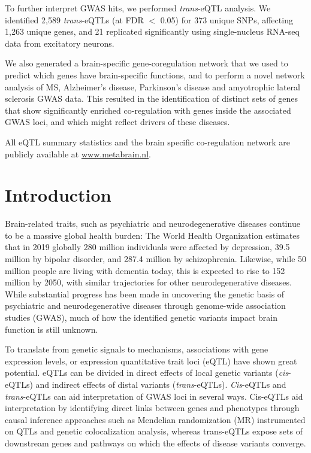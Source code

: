 To further interpret GWAS hits, we performed \emph{trans}-eQTL analysis. We identified 2,589 \emph{trans}-eQTLs (at FDR $<$ 0.05) for 373 unique SNPs, affecting 1,263 unique genes, and 21 replicated significantly using single-nucleus RNA-seq data from excitatory neurons.  

We also generated a brain-specific gene-coregulation network that we used to predict which genes have brain-specific functions, and to perform a novel network analysis of MS, Alzheimer’s disease, Parkinson’s disease and amyotrophic lateral sclerosis GWAS data. This resulted in the identification of distinct sets of genes that show significantly enriched co-regulation with genes inside the associated GWAS loci, and which might reflect drivers of these diseases. 

All eQTL summary statistics and the brain specific co-regulation network are publicly available at \url{www.metabrain.nl}. 

\section{Introduction}
Brain-related traits, such as psychiatric and neurodegenerative diseases continue to be a massive global health burden: The World Health Organization estimates that in 2019 globally 280 million individuals were affected by depression, 39.5 million by bipolar disorder, and 287.4 million by schizophrenia\cite{vosGlobalBurden3692020}. Likewise, while 50 million people are living with dementia today, this is expected to rise to 152 million by 2050\cite{WorldAlzheimerReport2018}, with similar trajectories for other neurodegenerative diseases. While substantial progress has been made in uncovering the genetic basis of psychiatric and neurodegenerative diseases through genome-wide association studies (GWAS), much of how the identified genetic variants impact brain function is still unknown.

To translate from genetic signals to mechanisms, associations with gene expression levels, or expression quantitative trait loci (eQTL) have shown great potential. eQTLs can be divided in direct effects of local genetic variants (\emph{cis}-eQTLs) and indirect effects of distal variants (\emph{trans}-eQTLs). \emph{Cis}-eQTLs and \emph{trans}-eQTLs can aid interpretation of GWAS loci in several ways. Cis-eQTLs aid interpretation by identifying direct links between genes and phenotypes through causal inference approaches such as Mendelian randomization (MR) instrumented on QTLs and genetic colocalization analysis, whereas trans-eQTLs expose sets of downstream genes and pathways on which the effects of disease variants converge.  

